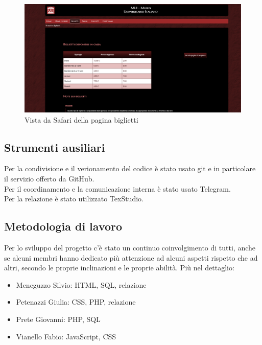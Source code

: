 \documentclass[10pt,a4paper,onecolumn]{article}
\begin{document}
\begin{figure}[H]
    \centering
    \includegraphics[scale=0.10]{biglietti_safari.png}
    \caption{Vista da Safari della pagina biglietti}
\end{figure}

\clearpage
\subsection{Strumenti ausiliari}
Per la condivisione e il verionamento del codice è stato usato git e in particolare il servizio offerto da GitHub.\\
Per il coordinamento e la comunicazione interna è stato usato Telegram.\\
Per la relazione è stato utilizzato TexStudio.

\subsection{Metodologia di lavoro}
Per lo sviluppo del progetto c’è stato un continuo coinvolgimento di tutti, anche se alcuni membri hanno dedicato più attenzione ad alcuni aspetti rispetto che ad altri, secondo le proprie inclinazioni e le proprie abilità. Più nel dettaglio:
\begin{itemize}
 \item Meneguzzo Silvio: HTML, SQL, relazione
 \item Petenazzi Giulia: CSS, PHP, relazione
 \item Prete Giovanni: PHP, SQL
 \item Vianello Fabio: JavaScript, CSS
\end{itemize}
\end{document}
